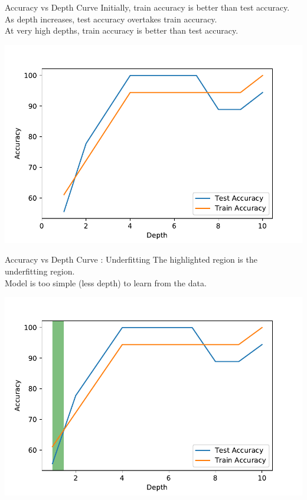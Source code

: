 \documentclass{beamer}
\begin{document}
	\begin{frame}{Accuracy vs Depth Curve}
	Initially, train accuracy is better than test accuracy.\\
	As depth increases, test accuracy overtakes train accuracy.\\
	At very high depths, train accuracy is better than test accuracy. 
	\begin{center}
	\includegraphics[scale=0.55]{acc-depth-plot}
	\end{center}
	\end{frame}

	\begin{frame}{Accuracy vs Depth Curve : Underfitting}
	The highlighted region is the underfitting region.\\
	Model is too simple (less depth) to learn from the data. 
	\begin{center}
	\includegraphics[scale=0.55]{acc-depth-plot-underfit}
	\end{center}
	\end{frame}
\end{document}
